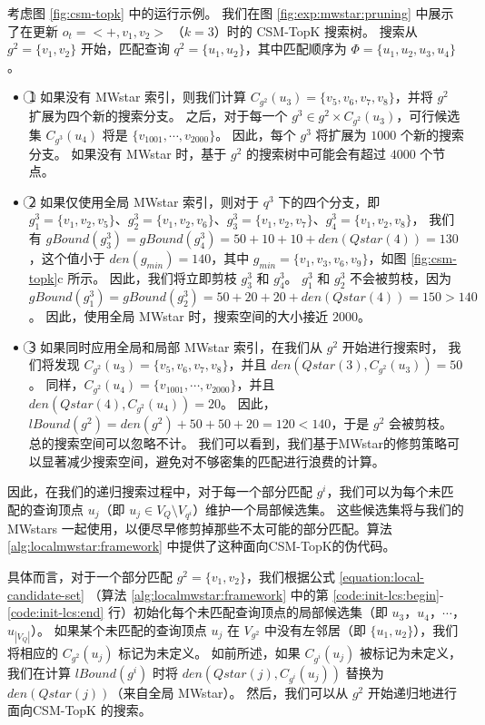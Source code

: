 考虑图 \ref{fig:csm-topk} 中的运行示例。
我们在图 \ref{fig:exp:mwstar:pruning} 中展示了在更新 $o_t=<+,v_1,v_2>$ （$k=3$）时的 CSM-TopK 搜索树。
搜索从 $g^2=\{v_1, v_2\}$ 开始，匹配查询 $q^2=\{u_1, u_2\}$，其中匹配顺序为 $\Phi=\{u_1, u_2, u_3, u_4\}$。
\begin{itemize}
\item
\textcircled{1} 如果没有 MWstar 索引，则我们计算 $C_{g^2}(u_3)=\{v_5, v_6, v_7, v_8\}$，并将 $g^2$ 扩展为四个新的搜索分支。
之后，对于每一个 $g^3 \in g^2 \times C_{g^2}(u_3)$，可行候选集 $C_{g^3}(u_4)$ 将是 $\{v_{1001}, \cdots, v_{2000}\}$。
因此，每个 $g^3$ 将扩展为 $1000$ 个新的搜索分支。
如果没有 MWstar 时，基于 $g^2$ 的搜索树中可能会有超过 $4000$ 个节点。
\item
\textcircled{2} 如果仅使用全局 MWstar 索引，则对于 $q^3$ 下的四个分支，即 $g_1^3=\{v_1, v_2, v_5\}$、$g_2^3=\{v_1, v_2, v_6\}$、$g_3^3=\{v_1, v_2, v_7\}$、$g_4^3=\{v_1, v_2, v_8\}$，
我们有 $gBound(g_3^3)=gBound(g_4^3)=50+10+10+den(Qstar(4))=130$，这个值小于 $den(g_{min})=140$，其中 $g_{min}=\{v_1, v_3, v_6, v_9\}$，如图 \ref{fig:csm-topk}c 所示。
因此，我们将立即剪枝 $g_3^3$ 和 $g_4^3$。
$g_1^3$ 和 $g_2^3$ 不会被剪枝，因为 $gBound(g_1^3) = gBound(g_2^3) = 50+20+20+den(Qstar(4)) = 150 > 140$。
因此，使用全局 MWstar 时，搜索空间的大小接近 $2000$。
\item
\textcircled{3} 如果同时应用全局和局部 MWstar 索引，在我们从 $g^2$ 开始进行搜索时，
我们将发现 $C_{g^2}(u_3)=\{v_5, v_6, v_7, v_8\}$，并且 $den(Qstar(3), C_{g^2}(u_3)) = 50$。
同样，$C_{g^2}(u_4)=\{v_{1001}, \cdots, v_{2000}\}$，并且 $den(Qstar(4), C_{g^2}(u_4)) = 20$。
因此，$lBound(g^2)=den(g^2)+50+50+20=120<140$，于是 $g^2$ 会被剪枝。
总的搜索空间可以忽略不计。
我们可以看到，我们基于MWstar的修剪策略可以显著减少搜索空间，避免对不够密集的匹配进行浪费的计算。
\end{itemize}

因此，在我们的递归搜索过程中，对于每一个部分匹配 $g^i$，我们可以为每个未匹配的查询顶点 $u_j$（即 $u_j \in V_Q \setminus V_{q^i}$）维护一个局部候选集。
这些候选集将与我们的 MWstars 一起使用，以便尽早修剪掉那些不太可能的部分匹配。算法 \ref{alg:localmwstar:framework} 中提供了这种面向CSM-TopK的伪代码。

具体而言，对于一个部分匹配 $g^2 = \{v_1, v_2\}$，我们根据公式 \ref{equation:local-candidate-set} （算法 \ref{alg:localmwstar:framework} 中的第 \ref{code:init-lcs:begin}-\ref{code:init-lcs:end} 行）初始化每个未匹配查询顶点的局部候选集（即 $u_3$，$u_4$，$\cdots$，$u_{|V_Q|}$）。
如果某个未匹配的查询顶点 $u_j$ 在 $V_{g^2}$ 中没有左邻居（即 $\{u_1, u_2\}$），我们将相应的 $C_{g^2}(u_j)$ 标记为未定义。
如前所述，如果 $C_{g^i}(u_j)$ 被标记为未定义，我们在计算 $lBound(g^i)$ 时将 $den(Qstar(j), C_{g^i}(u_j))$ 替换为 $den(Qstar(j))$（来自全局 MWstar）。
然后，我们可以从 $g^2$ 开始递归地进行 面向CSM-TopK 的搜索。

